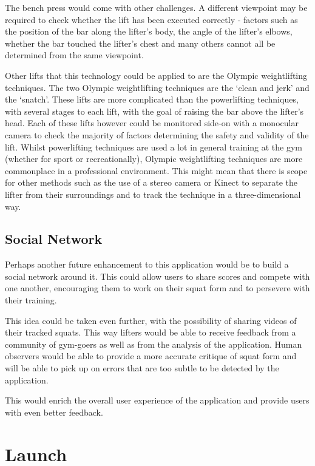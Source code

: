 The bench press would come with other challenges. A different viewpoint may be required to check whether the lift has been executed correctly - factors such as the position of the bar along the lifter's body, the angle of the lifter's elbows, whether the bar touched the lifter's chest and many others cannot all be determined from the same viewpoint.

Other lifts that this technology could be applied to are the Olympic weightlifting techniques. The two Olympic weightlifting techniques are the `clean and jerk' and the `snatch'. These lifts are more complicated than the powerlifting techniques, with several stages to each lift, with the goal of raising the bar above the lifter's head. Each of these lifts however could be monitored side-on with a monocular camera to check the majority of factors determining the safety and validity of the lift. Whilst powerlifting techniques are used a lot in general training at the gym (whether for sport or recreationally), Olympic weightlifting techniques are more commonplace in a professional environment. This might mean that there is scope for other methods such as the use of a stereo camera or Kinect to separate the lifter from their surroundings and to track the technique in a three-dimensional way. 

\subsection{Social Network}

Perhaps another future enhancement to this application would be to build a social network around it. This could allow users to share scores and compete with one another, encouraging them to work on their squat form and to persevere with their training.

This idea could be taken even further, with the possibility of sharing videos of their tracked squats. This way lifters would be able to receive feedback from a community of gym-goers as well as from the analysis of the application. Human observers would be able to provide a more accurate critique of squat form and will be able to pick up on errors that are too subtle to be detected by the application.

This would enrich the overall user experience of the application and provide users with even better feedback.

\section{Launch}

